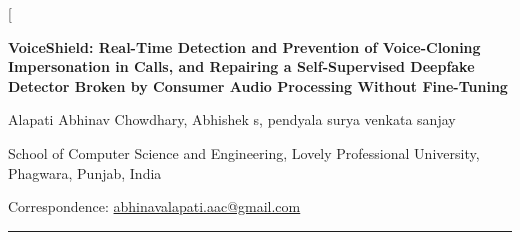 \documentclass[10pt,a4paper,twocolumn]{article}
\begin{document}
\twocolumn[
\begin{center}
{\sffamily\bfseries\LARGE VoiceShield: Real-Time Detection and Prevention of Voice-Cloning Impersonation in Calls, and Repairing a Self-Supervised Deepfake Detector Broken by Consumer Audio Processing Without Fine-Tuning\par}
\vspace{8pt}
{\large Alapati Abhinav Chowdhary, Abhishek s, pendyala surya venkata sanjay\par}
\vspace{5pt}
{\small School of Computer Science and Engineering, Lovely Professional University, Phagwara, Punjab, India\par}
{\small Correspondence: \href{mailto:abhinavalapati.aac@gmail.com}{abhinavalapati.aac@gmail.com}\par}
\end{center}
\vspace{4pt}
\noindent\rule{\textwidth}{0.4pt}
\vspace{4pt}
\end{document}

